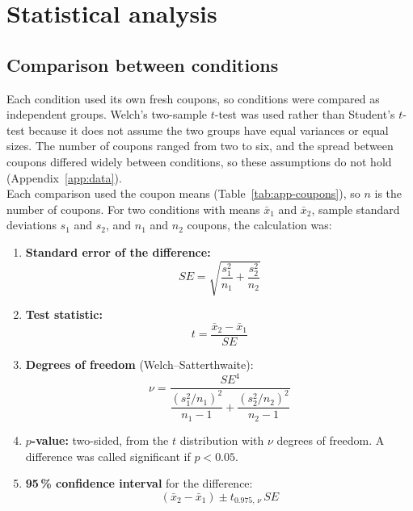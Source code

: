 \chapter{Statistical analysis}
\label{app:stats}

\section{Comparison between conditions}
\label{app:welch}
Each condition used its own fresh coupons, so conditions were compared as independent groups. Welch's two-sample $t$-test \citep{Welch1947} was used rather than Student's $t$-test because it does not assume the two groups have equal variances or equal sizes. The number of coupons ranged from two to six, and the spread between coupons differed widely between conditions, so these assumptions do not hold (Appendix~\ref{app:data}).\\

Each comparison used the coupon means (Table~\ref{tab:app-coupons}), so $n$ is the number of coupons. For two conditions with means $\bar{x}_1$ and $\bar{x}_2$, sample standard deviations $s_1$ and $s_2$, and $n_1$ and $n_2$ coupons, the calculation was:

\begin{enumerate}
  \item \textbf{Standard error of the difference:}
  \begin{equation}
    SE = \sqrt{\frac{s_1^2}{n_1} + \frac{s_2^2}{n_2}}
  \end{equation}
  \item \textbf{Test statistic:}
  \begin{equation}
    t = \frac{\bar{x}_2 - \bar{x}_1}{SE}
  \end{equation}
  \item \textbf{Degrees of freedom} (Welch--Satterthwaite):
  \begin{equation}
    \nu = \frac{SE^4}{\dfrac{(s_1^2/n_1)^2}{n_1 - 1} + \dfrac{(s_2^2/n_2)^2}{n_2 - 1}}
  \end{equation}
  \item \textbf{$p$-value:} two-sided, from the $t$ distribution with $\nu$ degrees of freedom. A difference was called significant if $p < 0.05$.
  \item \textbf{95\,\% confidence interval} for the difference:
  \begin{equation}
    (\bar{x}_2 - \bar{x}_1) \pm t_{0.975,\,\nu}\,SE
  \end{equation}
\end{enumerate}


